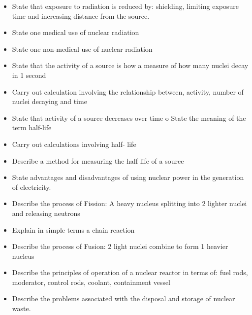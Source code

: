 \begin{multicols}{2}
\begin{itemize}
		\item State that exposure to radiation is reduced by: shielding, limiting
			exposure time and increasing distance from the source.
		\item State one medical use of nuclear radiation
		\item State one non-medical use of nuclear radiation
		\item State that the activity of a source is how a measure of how many
			nuclei decay in 1 second
		\item Carry out calculation involving the relationship between, activity,
			number of nuclei decaying and time
		\item State that activity of a source decreases over time o State the meaning
			of the term half-life
		\item Carry out calculations involving half- life
		\item Describe a method for measuring the half life of a source
		\item State advantages and disadvantages of using nuclear power in the
			generation of electricity.
		\item Describe the process of Fission: A heavy nucleus splitting into 2
			lighter nuclei and releasing neutrons
		\item Explain in simple terms a chain reaction
		\item Describe the process of Fusion: 2 light nuclei combine to form 1
			heavier nucleus
		\item Describe the principles of operation of a nuclear reactor in terms of:
			fuel rods, moderator, control rods, coolant, containment vessel
		\item Describe the problems associated with the disposal and storage of
			nuclear waste.
	\end{itemize}
\end{multicols}

